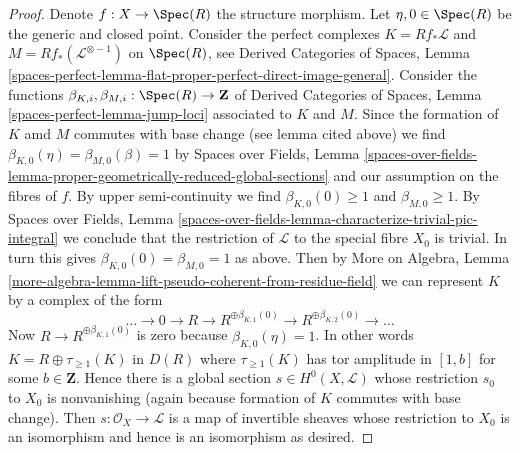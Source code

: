 \begin{proof}
\medskip\noindent
Denote $f : X \to \Spec(R)$ the structure morphism.
Let $\eta, 0 \in \Spec(R)$ be the generic and closed point.
Consider the perfect complexes
$K = Rf_*\mathcal{L}$ and $M = Rf_*(\mathcal{L}^{\otimes -1})$
on $\Spec(R)$, see Derived Categories of Spaces, Lemma
\ref{spaces-perfect-lemma-flat-proper-perfect-direct-image-general}.
Consider the functions
$\beta_{K, i}, \beta_{M, i} : \Spec(R) \to \mathbf{Z}$
of Derived Categories of Spaces, Lemma
\ref{spaces-perfect-lemma-jump-loci} associated to $K$ and $M$.
Since the formation of $K$ amd $M$ commutes with
base change (see lemma cited above) we find
$\beta_{K, 0}(\eta) = \beta_{M, 0}(\beta) = 1$ by
Spaces over Fields, Lemma
\ref{spaces-over-fields-lemma-proper-geometrically-reduced-global-sections}
and our assumption on the fibres of $f$.
By upper semi-continuity we find
$\beta_{K, 0}(0) \geq 1$ and $\beta_{M, 0} \geq 1$.
By 
Spaces over Fields, Lemma
\ref{spaces-over-fields-lemma-characterize-trivial-pic-integral}
we conclude that the restriction of $\mathcal{L}$
to the special fibre $X_0$ is trivial. In turn this gives
$\beta_{K, 0}(0) = \beta_{M, 0} = 1$ as above.
Then by More on Algebra, Lemma
\ref{more-algebra-lemma-lift-pseudo-coherent-from-residue-field}
we can represent $K$ by a complex of the form
$$
\ldots \to 0 \to R \to R^{\oplus \beta_{K, 1}(0)} \to
R^{\oplus \beta_{K, 2}(0)} \to \ldots
$$
Now $R \to R^{\oplus \beta_{K, 1}(0)}$ is zero
because $\beta_{K, 0}(\eta) = 1$. In other words
$K = R \oplus \tau_{\geq 1}(K)$ in $D(R)$ where $\tau_{\geq 1}(K)$
has tor amplitude in $[1, b]$ for some $b \in \mathbf{Z}$.
Hence there is a global section $s \in H^0(X, \mathcal{L})$
whose restriction $s_0$
to $X_0$ is nonvanishing (again because formation of $K$
commutes with base change). Then $s : \mathcal{O}_X \to \mathcal{L}$
is a map of invertible sheaves whose restriction to $X_0$
is an isomorphism and hence is an isomorphism as desired.
\end{proof}

















